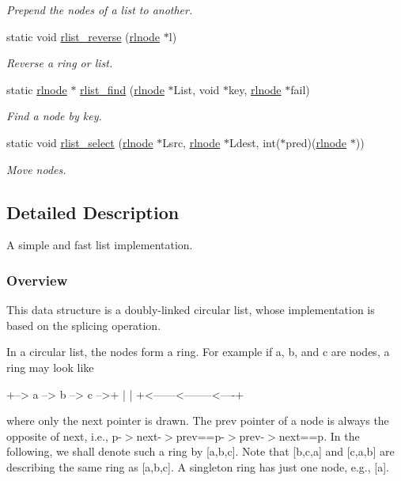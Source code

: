 \begin{DoxyCompactItemize}
\begin{DoxyCompactList}\small\item\em Prepend the nodes of a list to another. \end{DoxyCompactList}\item 
static void \hyperlink{group__rlists_ga3911836f21f2f50b4caa2fa1d8e1f1de}{rlist\-\_\-reverse} (\hyperlink{group__rlists_ga8f6244877f7ce2322c90525217ea6e7a}{rlnode} $\ast$l)
\begin{DoxyCompactList}\small\item\em Reverse a ring or list. \end{DoxyCompactList}\item 
static \hyperlink{group__rlists_ga8f6244877f7ce2322c90525217ea6e7a}{rlnode} $\ast$ \hyperlink{group__rlists_gafbb3a5edeac9f1d43130528292c47cf6}{rlist\-\_\-find} (\hyperlink{group__rlists_ga8f6244877f7ce2322c90525217ea6e7a}{rlnode} $\ast$List, void $\ast$key, \hyperlink{group__rlists_ga8f6244877f7ce2322c90525217ea6e7a}{rlnode} $\ast$fail)
\begin{DoxyCompactList}\small\item\em Find a node by key. \end{DoxyCompactList}\item 
static void \hyperlink{group__rlists_ga6016cbc055d242a03d823ebfec422c2b}{rlist\-\_\-select} (\hyperlink{group__rlists_ga8f6244877f7ce2322c90525217ea6e7a}{rlnode} $\ast$Lsrc, \hyperlink{group__rlists_ga8f6244877f7ce2322c90525217ea6e7a}{rlnode} $\ast$Ldest, int($\ast$pred)(\hyperlink{group__rlists_ga8f6244877f7ce2322c90525217ea6e7a}{rlnode} $\ast$))
\begin{DoxyCompactList}\small\item\em Move nodes. \end{DoxyCompactList}\end{DoxyCompactItemize}


\subsection{Detailed Description}
A simple and fast list implementation. \subsubsection*{Overview }

This data structure is a doubly-\/linked circular list, whose implementation is based on the splicing operation.

In a circular list, the nodes form a ring. For example if a, b, and c are nodes, a ring may look like \begin{DoxyVerb}+--> a --> b --> c -->+
|                     |
+<------<--------<----+
\end{DoxyVerb}
 where only the {\ttfamily next} pointer is drawn. The {\ttfamily prev} pointer of a node is always the opposite of {\ttfamily next}, i.\-e., {\ttfamily p-\/$>$next-\/$>$prev==p-\/$>$prev-\/$>$next==p}. In the following, we shall denote such a ring by \mbox{[}a,b,c\mbox{]}. Note that \mbox{[}b,c,a\mbox{]} and \mbox{[}c,a,b\mbox{]} are describing the same ring as \mbox{[}a,b,c\mbox{]}. A singleton ring has just one node, e.\-g., \mbox{[}a\mbox{]}.

